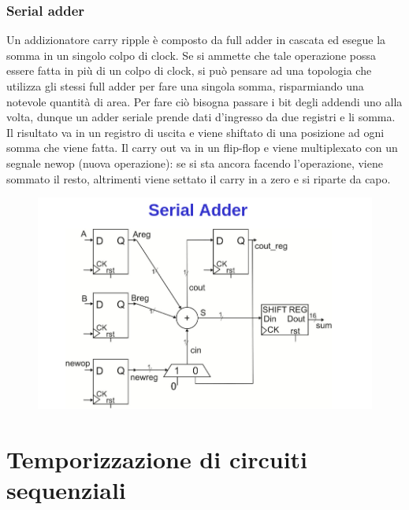\documentclass{book}
\begin{document}
    \subsection{Serial adder}
        Un addizionatore carry ripple è composto da full adder in cascata ed esegue la somma
        in un singolo colpo di clock. Se si ammette che tale operazione possa essere fatta in più di un
        colpo di clock, si può pensare ad una topologia che utilizza gli stessi full adder per
        fare una singola somma, risparmiando una notevole quantità di area. Per fare ciò bisogna
        passare i bit degli addendi uno alla volta, dunque un adder seriale prende dati d'ingresso da due
        registri e li somma. Il risultato va in un registro di uscita e viene shiftato di una posizione ad ogni somma
        che viene fatta. Il carry out va in un flip-flop e viene multiplexato con un segnale newop (nuova operazione):
        se si sta ancora facendo l'operazione, viene sommato il resto, altrimenti viene settato il carry in a zero e si riparte
        da capo.
        \begin{figure}[h!]
            \center
            \includegraphics[width=0.75\linewidth]{img/chapt11img17.png}
        \end{figure}
    \chapter{Temporizzazione di circuiti sequenziali}
\end{document}
